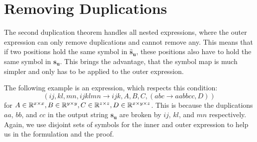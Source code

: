 \section{Removing Duplications}

The second duplication theorem handles all nested expressions, where the outer expression can only remove duplications and cannot remove any.
This means that if two positions hold the same symbol in $\bm{\hat{s}_u}$, these positions also have to hold the same symbol in $\bm{s_u}$.
This brings the advantage, that the symbol map is much simpler and only has to be applied to the outer expression.

The following example is an expression, which respects this condition:
$$(ij, kl, mn, ijklmn \rightarrow ijk, A, B, C, (abc \rightarrow aabbcc, D))$$
for $A \in \mathbb{R}^{x \times x}, B \in \mathbb{R}^{y \times y}, C \in \mathbb{R}^{z \times z}, D \in \mathbb{R}^{x \times y \times z}$.
This is because the duplications $aa$, $bb$, and $cc$ in the output string $\bm{s_u}$ are broken by $ij$, $kl$, and $mn$ respectively.
Again, we use disjoint sets of symbols for the inner and outer expression to help us in the formulation and the proof.

